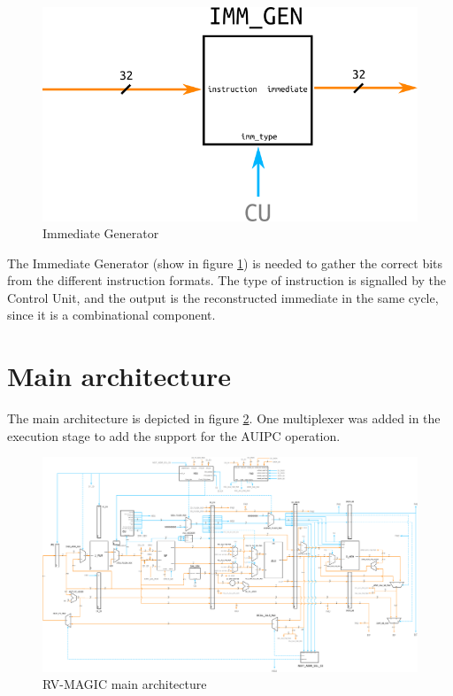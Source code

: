 \documentclass[a4paper]{article}
\begin{document}
\begin{figure}[hbtp]
    \centering
    \includegraphics[]{../immgen/ref/schematic/immgen.png}
    \caption{Immediate Generator}
    \label{fig:immgen}
\end{figure}

The Immediate Generator (show in figure \ref{fig:immgen}) is needed to gather the correct bits from the different instruction formats. The type of instruction is signalled by the Control Unit, and the output is the reconstructed immediate in the same cycle, since it is a combinational component.

\section{Main architecture}
The main architecture is depicted in figure \ref{fig:rv-magic_main}. One multiplexer was added in the execution stage to add the support for the AUIPC operation.

\begin{figure}[hbtp]
	\centering
    \includegraphics[scale=0.2]{../main/ref/schematic/rvMagic.png}
    \caption{RV-MAGIC main architecture}
    \label{fig:rv-magic_main}
\end{figure}
\end{document}
